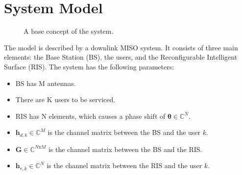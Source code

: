 \section{System Model}

\begin{figure}[htbp]
\caption{A base concept of the system.}
\end{figure}

The model is described by a downlink MISO system. It consists of three main elements: the Base Station (BS), the users, and the Reconfigurable Intelligent Surface (RIS).
The system has the following parameters:
\begin{itemize}
    \item BS has M antennas.
    \item There are K users to be serviced.
    \item RIS has N elements, which causes a phase shift of $\bm{\theta} \in \mathbb{C}^N$.
    \item $\bm{h}_{d, k} \in \mathbb{C}^{M}$ is the channel matrix between the BS and the user $k$.
    \item $\bm{G} \in \mathbb{C}^{N \text{x} M}$ is the channel matrix between the BS and the RIS.
    \item $\bm{h}_{r, k} \in \mathbb{C}^{N}$ is the channel matrix between the RIS and the user $k$. 
\end{itemize}

